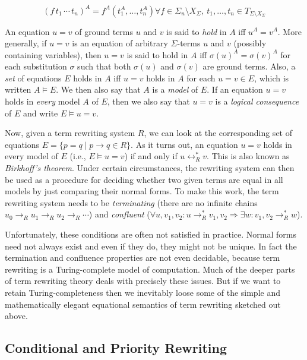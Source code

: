 \documentclass[a4paper,12pt]{article}
\begin{document}
\[ (f\,t_1\,\cdots\,t_n)^A=f^A(t_1^A,\ldots,t_n^A)\mathrel{\forall}f\in\Sigma_n\setminus X_\Sigma,\ t_1,\ldots,t_n\in T_{\Sigma\setminus X_\Sigma} \]

An equation $u=v$ of ground terms $u$ and $v$ is said to \emph{hold} in $A$ iff $u^A=v^A$. More generally, if $u=v$ is an equation of arbitrary $\Sigma$-terms $u$ and $v$ (possibly containing variables), then $u=v$ is said to hold in $A$ iff $\sigma(u)^A=\sigma(v)^A$ for each substitution $\sigma$ such that both $\sigma(u)$ and $\sigma(v)$ are ground terms. Also, a \emph{set} of equations $E$ holds in $A$ iff $u=v$ holds in $A$ for each $u=v\in E$, which is written $A\vDash E$. We then also say that $A$ is a \emph{model} of $E$. If an equation $u=v$ holds in \emph{every} model $A$ of $E$, then we also say that $u=v$ is a \emph{logical consequence} of $E$ and write $E\vDash u=v$.

Now, given a term rewriting system $R$, we can look at the corresponding set of equations $E=\{p=q\mathrel{|}p\rightarrow q\in R\}$. As it turns out, an equation $u=v$ holds in every model of $E$ (i.e., $E\vDash u=v$) if and only if $u\leftrightarrow_R^*v$. This is also known as \emph{Birkhoff's theorem}. Under certain circumstances, the rewriting system can then be used as a procedure for deciding whether two given terms are equal in all models by just comparing their normal forms. To make this work, the term rewriting system needs to be \emph{terminating} (there are no infinite chains $u_0\rightarrow_R u_1\rightarrow_R u_2\rightarrow_R\cdots$) and \emph{confluent} ($\forall u,v_1,v_2:u\rightarrow_R^* v_1,v_2\Rightarrow \exists w:v_1,v_2\rightarrow_R^* w$).

Unfortunately, these conditions are often not satisfied in practice. Normal forms need not always exist and even if they do, they might not be unique. In fact the termination and confluence properties are not even decidable, because term rewriting is a Turing-complete model of computation. Much of the deeper parts of term rewriting theory deals with precisely these issues. But if we want to retain Turing-completeness then we inevitably loose some of the simple and mathematically elegant equational semantics of term rewriting sketched out above.

\subsection{Conditional and Priority Rewriting}
\end{document}
